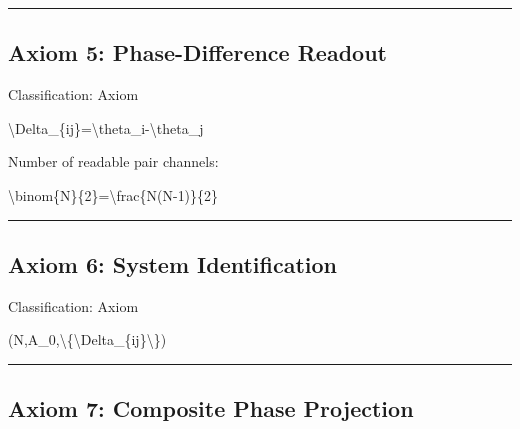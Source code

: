 \documentclass[
  a4paper]{article}
\newenvironment{Shaded}{}{}
\newcommand{\NormalTok}[1]{#1}
\begin{document}
\begin{center}\rule{0.5\linewidth}{0.5pt}\end{center}

\subsection{Axiom 5: Phase-Difference
Readout}\label{axiom-5-phase-difference-readout}

Classification: Axiom

\begin{Shaded}
\begin{Highlighting}[]
\NormalTok{\textbackslash{}Delta\_\{ij\}=\textbackslash{}theta\_i{-}\textbackslash{}theta\_j}
\end{Highlighting}
\end{Shaded}

Number of readable pair channels:

\begin{Shaded}
\begin{Highlighting}[]
\NormalTok{\textbackslash{}binom\{N\}\{2\}=\textbackslash{}frac\{N(N{-}1)\}\{2\}}
\end{Highlighting}
\end{Shaded}

\begin{center}\rule{0.5\linewidth}{0.5pt}\end{center}

\subsection{Axiom 6: System
Identification}\label{axiom-6-system-identification}

Classification: Axiom

\begin{Shaded}
\begin{Highlighting}[]
\NormalTok{(N,A\_0,\textbackslash{}\{\textbackslash{}Delta\_\{ij\}\textbackslash{}\})}
\end{Highlighting}
\end{Shaded}

\begin{center}\rule{0.5\linewidth}{0.5pt}\end{center}

\subsection{Axiom 7: Composite Phase
Projection}\label{axiom-7-composite-phase-projection}
\end{document}

